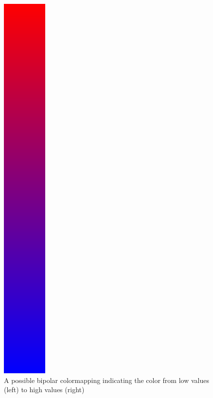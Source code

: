 \begin{description}
\begin{figure}[htb]
			  \includegraphics[angle=270, width=\linewidth, totalheight=1em, frame]{./content/pictures/bipolar.png}
			  \caption{A possible bipolar colormapping indicating the color from low values (left) to high values (right)}
			\end{figure}


\end{description}

